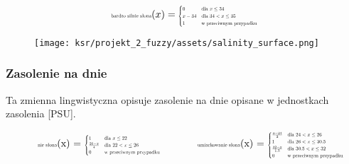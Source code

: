 \documentclass{article}
\begin{document}
\begin{equation*}
\text{\scalebox{0.5}{bardzo silnie słona}}(x) = 
\scalebox{0.5}{$
\begin{cases} 
0 & \text{dla } x \leq 34 \\
x - 34 & \text{dla } 34 < x \leq 35 \\
1 & \text{w przeciwnym przypadku}
\end{cases}
$}
\end{equation*}


\begin{figure}[H]
\centering
\texttt{[image: ksr/projekt\_2\_fuzzy/assets/salinity\_surface.png]}
\label{fig:epsilon_bat}
\end{figure}

\subsubsection{Zasolenie na dnie}

\noindent Ta zmienna lingwistyczna opisuje zasolenie na dnie opisane w jednostkach zasolenia [PSU].

\begin{equation*}
\begin{minipage}{0.5\textwidth}
\centering
\text{\scalebox{0.5}{nie słona}}(x) = \scalebox{0.5}{$
\begin{cases} 
1 & \text{dla } x \leq 22 \\
\frac{26 - x}{4} & \text{dla } 22 < x \leq 26 \\
0 & \text{w przeciwnym przypadku}
\end{cases}
$}
\end{minipage}%
\begin{minipage}{0.5\textwidth}
\centering
\text{\scalebox{0.5}{umiarkowanie słona}}(x) = \scalebox{0.5}{$
\begin{cases} 
\frac{x - 24}{2} & \text{dla } 24 < x \leq 26 \\
1 & \text{dla } 26 < x \leq 30.5 \\
\frac{32 - x}{1.5} & \text{dla } 30.5 < x \leq 32 \\
0 & \text{w przeciwnym przypadku}
\end{cases}
$}
\end{minipage}
\end{equation*}
\end{document}
